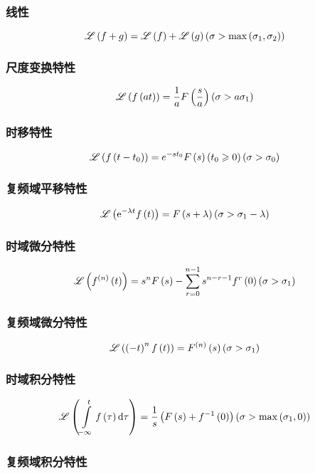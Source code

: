 \documentclass{article}
\begin{document}
\subsubsection{线性}

\[\mathscr L\left(f+g\right)=\mathscr L\left(f\right)+\mathscr L\left(g\right)
    \left(\sigma>\max\left(\sigma_1,\sigma_2\right)\right)\]

\subsubsection{尺度变换特性}

\[\mathscr L\left(f\left(at\right)\right)=\frac1aF\left(\frac sa\right)
    \left(\sigma>a\sigma_1\right)\]

\subsubsection{时移特性}

\[\mathscr L\left(f\left(t-t_0\right)\right)=e^{-st_0}F\left(s\right)\left(t_0\geqslant0\right)
    \left(\sigma>\sigma_0\right)\]

\subsubsection{复频域平移特性}

\[\mathscr L\left(\mathrm e^{-\lambda t}f\left(t\right)\right)=F\left(s+\lambda\right)
    \left(\sigma>\sigma_1-\lambda\right)\]

\subsubsection{时域微分特性}

\[\mathscr L\left(f^{\left(n\right)}\left(t\right)\right)=s^nF\left(s\right)-\sum_{r=0}^{n-1}s^{n-r-1}f^r\left(0\right)
    \left(\sigma>\sigma_1\right)\]

\subsubsection{复频域微分特性}

\[\mathscr L\left(\left(-t\right)^nf\left(t\right)\right)=F^{\left(n\right)}\left(s\right)
    \left(\sigma>\sigma_1\right)\]

\subsubsection{时域积分特性}

\[\mathscr L\left(\int\limits_{-\infty}^tf\left(\tau\right)\mathrm d\tau\right)=
    \frac1s\left(F\left(s\right)+f^{-1}\left(0\right)\right)
    \left(\sigma>\max\left(\sigma_1,0\right)\right)\]

\subsubsection{复频域积分特性}
\end{document}
